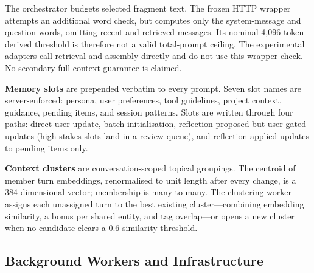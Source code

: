 \documentclass[twoside,11pt]{article}
\begin{document}
The orchestrator budgets selected fragment text. The frozen HTTP wrapper attempts an additional word check, but computes only the system-message and question words, omitting recent and retrieved messages. Its nominal 4,096-token-derived threshold is therefore not a valid total-prompt ceiling. The experimental adapters call retrieval and assembly directly and do not use this wrapper check. No secondary full-context guarantee is claimed.

\textbf{Memory slots} are prepended verbatim to every prompt. Seven slot names are server-enforced: persona, user preferences, tool guidelines, project context, guidance, pending items, and session patterns. Slots are written through four paths: direct user update, batch initialisation, reflection-proposed but user-gated updates (high-stakes slots land in a review queue), and reflection-applied updates to pending items only.

\textbf{Context clusters} are conversation-scoped topical groupings. The centroid of member turn embeddings, renormalised to unit length after every change, is a 384-dimensional vector; membership is many-to-many. The clustering worker assigns each unassigned turn to the best existing cluster---combining embedding similarity, a bonus per shared entity, and tag overlap---or opens a new cluster when no candidate clears a 0.6 similarity threshold.

\subsection{Background Workers and Infrastructure}
\label{app:workers}
\end{document}
